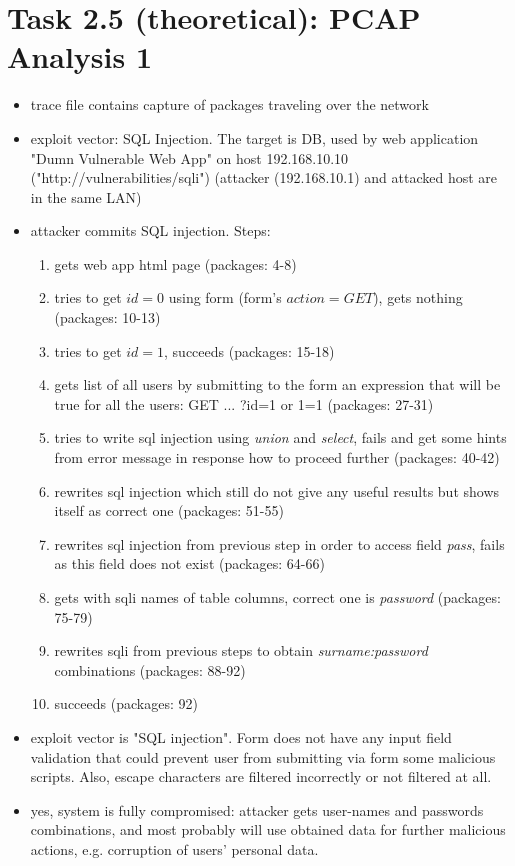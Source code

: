 \documentclass{article}
\begin{document}
\section*{Task 2.5 (theoretical): PCAP Analysis 1}
\begin{itemize}
\item trace file contains capture of packages traveling over the network
\item exploit vector: SQL Injection. The target is DB, used by web application "Dumn Vulnerable Web App" on host 192.168.10.10 ("http://vulnerabilities/sqli") (attacker (192.168.10.1) and attacked host are in the same LAN)
\item attacker commits SQL injection. Steps:
\begin{enumerate}
\item gets web app html page (packages: 4-8)
\item tries to get $id=0$ using form (form's $action=GET$), gets nothing (packages: 10-13)
\item tries to get $id=1$, succeeds (packages: 15-18)
\item gets list of all users by submitting to the form an expression that will be true for all the users: GET ... ?id=1 or 1=1 (packages: 27-31)
\item tries to write sql injection using \textit {union} and \textit{select}, fails and get some hints from error message in response how to proceed further (packages: 40-42) 
\item rewrites sql injection which still do not give any useful results but shows itself as correct one (packages: 51-55)
\item rewrites sql injection from previous step in order to access field \textit{pass}, fails as this field does not exist (packages: 64-66)
\item gets with sqli names of table columns, correct one is \textit{password} (packages: 75-79)
\item rewrites sqli from previous steps to obtain \textit{surname:password} combinations (packages: 88-92)
\item succeeds (packages: 92)
\end{enumerate}
\item exploit vector is "SQL injection". Form does not have any input field validation that could prevent user from submitting via form some malicious scripts. Also, escape characters are filtered incorrectly or not filtered at all.
\item yes, system is fully compromised: attacker gets user-names and passwords combinations, and most probably will use obtained data for further malicious actions, e.g. corruption of users' personal data.

\end{itemize}
\end{document}
